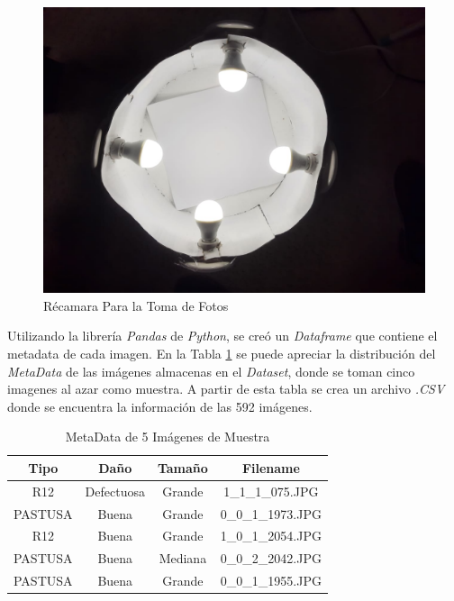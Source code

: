	\begin{figure}[ht]
		\centering
		\includegraphics[scale=0.15]{Figs/Chamber.JPEG}
		\caption{Récamara Para la Toma de Fotos}
		\label{fig:chamber}
	\end{figure}
	
	Utilizando la librería \textit{Pandas} de \textit{Python}, se creó un \textit{Dataframe} que contiene el metadata de cada imagen. En la Tabla \ref{table:metadata} se puede apreciar la distribución del \textit{MetaData} de las imágenes almacenas en el \textit{Dataset}, donde se toman cinco imagenes al azar como muestra. A partir de esta tabla se crea un archivo \textit{.CSV} donde se encuentra la información de las 592 imágenes.
	
	\begin{table}[ht]
		\centering
		\begin{tabular}{|c|c|c|c|}
			\hline
			Tipo & Daño & Tamaño & Filename \\
			\hline
			R12 & Defectuosa & Grande & 1\_1\_1\_075.JPG \\
			\hline
			PASTUSA & Buena & Grande & 0\_0\_1\_1973.JPG \\
			\hline
			R12 & Buena & Grande & 1\_0\_1\_2054.JPG \\
			\hline
			PASTUSA & Buena & Mediana & 0\_0\_2\_2042.JPG \\
			\hline
			PASTUSA & Buena & Grande & 0\_0\_1\_1955.JPG \\
			\hline
		\end{tabular}	
		\caption{MetaData de 5 Imágenes de Muestra}
		\label{table:metadata}
	\end{table}


